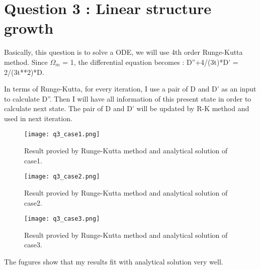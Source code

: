 \section{Question 3 : Linear structure growth}
Basically, this question is to solve a ODE, we will use 4th order Runge-Kutta method.
Since $\Omega_m$ = 1, the differential equation becomes :
D''+4/(3t)*D' = 2/(3t**2)*D.

In terms of Runge-Kutta, for every iteration, I use a pair of D and D' as an input to calculate D''. Then I will have all information of this present state in order to calculate next state. The pair of D and D' will be updated by R-K method and used
in next iteration.



\begin{figure}
  \centering
  \texttt{[image: q3\_case1.png]}
  \caption{Result provied by Runge-Kutta method and analytical solution of case1.}
  \label{fig:q3_case1}
\end{figure}

\begin{figure}
  \centering
  \texttt{[image: q3\_case2.png]}
  \caption{Result provied by Runge-Kutta method and analytical solution of case2.}
  \label{fig:q3_case1}
\end{figure}

\begin{figure}
  \centering
  \texttt{[image: q3\_case3.png]}
  \caption{Result provied by Runge-Kutta method and analytical solution of case3.}
  \label{fig:q3_case1}
\end{figure}

The fugures show that my results fit with analytical solution very well.
